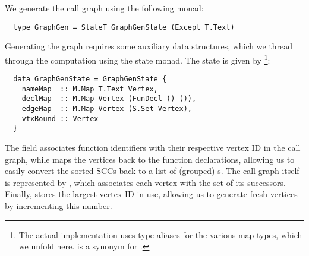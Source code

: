 We generate the call graph using the following monad:
\begin{verbatim}
  type GraphGen = StateT GraphGenState (Except T.Text)
\end{verbatim}
%
Generating the graph requires some auxiliary data structures, which we thread
through the computation using the state monad. The state is given by
\footnote{The actual implementation uses type aliases for
the various map types, which we unfold here.
 is a synonym for .}:
\begin{verbatim}
  data GraphGenState = GraphGenState {
    nameMap  :: M.Map T.Text Vertex,
    declMap  :: M.Map Vertex (FunDecl () ()),
    edgeMap  :: M.Map Vertex (S.Set Vertex),
    vtxBound :: Vertex
  }
\end{verbatim}
%
The  field associates function identifiers with their respective
vertex ID in the call graph, while  maps the vertices back to the
function declarations, allowing us to easily convert the sorted SCCs back to a
list of (grouped) s.
The call graph itself is represented by , which associates each
vertex with the set of its successors. Finally,  stores the
largest vertex ID in use, allowing us to generate fresh vertices by incrementing
this number.


